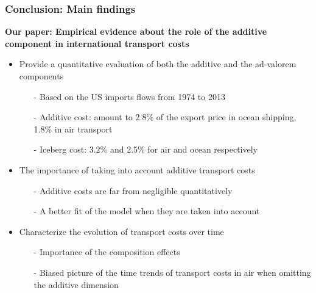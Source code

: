 \documentclass[10 pt,Helvetica, french]{beamer}
\begin{document}
\begin{frame}
\frametitle{Conclusion: Main findings}
\textbf{Our paper: Empirical evidence about the role of the additive component in international transport costs} \vspace{0.1cm}
\begin{itemize}
\item Provide a quantitative evaluation of both the additive and the ad-valorem components \vspace{0.1cm}
\begin{itemize}
\item[-] Based on the US imports flows from 1974 to 2013 \vspace{0.1cm}
\item[-] Additive cost: amount to 2.8\% of the export price in ocean shipping, 1.8\% in air transport \vspace{0.1cm}
\item[-] Iceberg cost: 3.2\% and 2.5\% for air and ocean respectively \vspace{0.1cm}
\end{itemize}
\item The importance of taking into account additive transport costs \vspace{0.1cm}
\begin{itemize}
\item[-] Additive costs are far from negligible quantitatively \vspace{0.1cm}
\item[-] A better fit of the model when they are taken into account    \vspace{0.1cm}
\end{itemize}
\item Characterize the evolution of transport costs over time \vspace{0.1cm}
\begin{itemize}
\item[-] Importance of the composition effects \vspace{0.1cm}
\item[-] Biased picture of the time trends of transport costs in air when omitting the additive dimension
\end{itemize}
\end{itemize}

\end{frame}
\end{document}
